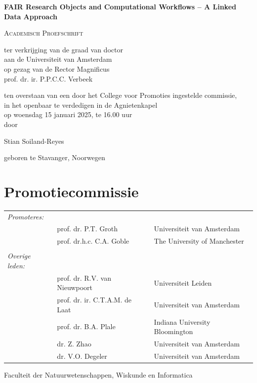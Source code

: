 \begin{center}

    
\Huge
\textbf{FAIR Research Objects and Computational Workflows – A Linked Data Approach}
     
\vspace*{\fill}

\LARGE
\textsc{Academisch Proefschrift}

\vspace*{\fill}

\large
{ \itshape

ter verkrijging van de graad van doctor\\
aan de Universiteit van Amsterdam\\
op gezag van de Rector Magnificus\\
prof. dr. ir. P.P.C.C. Verbeek

ten overstaan van een door het College voor Promoties ingestelde commissie,\\
in het openbaar te verdedigen in de Agnietenkapel\\
op woensdag 15 januari 2025, te 16.00 uur\\


door 
}

\vspace*{\fill}

\LARGE
Stian Soiland-Reyes

\large
geboren te Stavanger, Noorwegen 

\end{center}

\newpage

\section*{Promotiecommissie}

\begin{tabular}{lll}

\textit{Promoteres:}  &  & \\
     & prof. dr. P.T. Groth     & Universiteit van Amsterdam \\
     & prof. dr.h.c. C.A. Goble & The University of Manchester \\
	& & \\     

\textit{Overige leden:} & & \\
     &  prof. dr. R.V. van Nieuwpoort   & Universiteit Leiden \\
     &  prof. dr. ir. C.T.A.M. de Laat  & Universiteit van Amsterdam \\
     &  prof. dr. B.A. Plale     & Indiana University Bloomington  \\     
     &  dr. Z. Zhao         & Universiteit van Amsterdam  \\     
     &  dr. V.O. Degeler     & Universiteit van Amsterdam \\
\end{tabular}

Faculteit der Natuurwetenschappen, Wiskunde en Informatica
